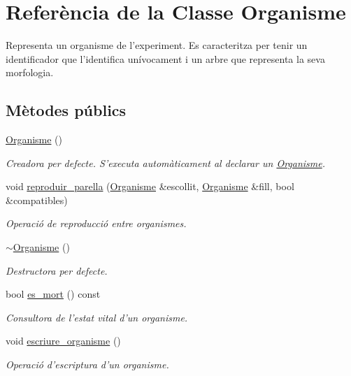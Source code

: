 \hypertarget{class_organisme}{\section{Referència de la Classe Organisme}
\label{class_organisme}
}


Representa un organisme de l'experiment. Es caracteritza per tenir un identificador que l'identifica unívocament i un arbre que representa la seva morfologia.  


\subsection*{Mètodes públics}
\begin{DoxyCompactItemize}
\item 
\hyperlink{class_organisme_a5624eb8adf14bc96d783067d51605fbd}{Organisme} ()
\begin{DoxyCompactList}\small\item\em Creadora per defecte. S'executa automàticament al declarar un \hyperlink{class_organisme}{Organisme}. \end{DoxyCompactList}\item 
void \hyperlink{class_organisme_a96d8ba5ebd0a28819879b0f9371a8aef}{reproduir\-\_\-parella} (\hyperlink{class_organisme}{Organisme} \&escollit, \hyperlink{class_organisme}{Organisme} \&fill, bool \&compatibles)
\begin{DoxyCompactList}\small\item\em Operació de reproducció entre organismes. \end{DoxyCompactList}\item 
\hyperlink{class_organisme_a55c9d7cbc9683970ad88455fdc3be7aa}{$\sim$\-Organisme} ()
\begin{DoxyCompactList}\small\item\em Destructora per defecte. \end{DoxyCompactList}\item 
bool \hyperlink{class_organisme_abe3c4923cc5641e48724312bc298c8a9}{es\-\_\-mort} () const 
\begin{DoxyCompactList}\small\item\em Consultora de l'estat vital d'un organisme. \end{DoxyCompactList}\item 
void \hyperlink{class_organisme_a5ab6abd54070a56ceee9774b63ad041e}{escriure\-\_\-organisme} ()
\begin{DoxyCompactList}\small\item\em Operació d'escriptura d'un organisme. \end{DoxyCompactList}\item 

\end{DoxyCompactItemize}
